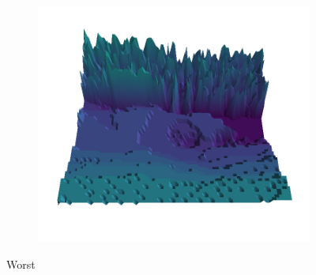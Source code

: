\begin{figure}[H]
    \begin{subfigure}[b]{0.19\textwidth}
        \includegraphics[width=\linewidth]{../img/5/quarry/worst//patch-3d-majavi-colormap-4.png}
    \end{subfigure}  

\caption{Worst}    
\end{figure}


